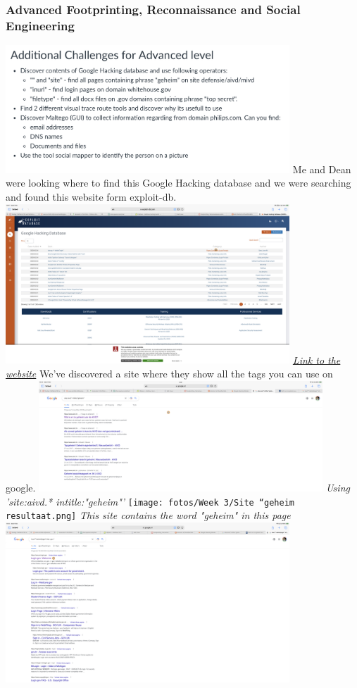 \documentclass[12pt, letterpaper]{article}
\begin{document}
\subsubsection{Advanced Footprinting, Reconnaissance and Social Engineering}
\includegraphics[width=0.8\textwidth]{fotos/Week 3/Advanced footprinting.jpeg}
\hfill\break
\hfill\break
Me and Dean were looking where to find this Google Hacking database and we were searching and found this website form exploit-db.
\hfill\break
\hfill\break
\includegraphics[width=0.8\textwidth]{fotos/Week 3/Google hacking database tags.png}
\break
\emph{\hyperlink{https://www.exploit-db.com/google-hacking-database}{Link to the website}}
We've discovered a site where they show all the tags you can use on google.
\hfill\break
\hfill\break
\includegraphics[width=0.8\textwidth]{fotos/Week 3/Site “geheim”.jpeg}
\break
\emph{Using 'site:aivd.* intitle:"geheim"'}
\hfill\break
\hfill\break
\texttt{[image: fotos/Week 3/Site “geheim resultaat.png]}
\break
\emph{This site contains the word "geheim" in this page}
\hfill\break
\hfill\break
\includegraphics[width=0.8\textwidth]{fotos/Week 3/Inurl whitehouse.png}
\end{document}
